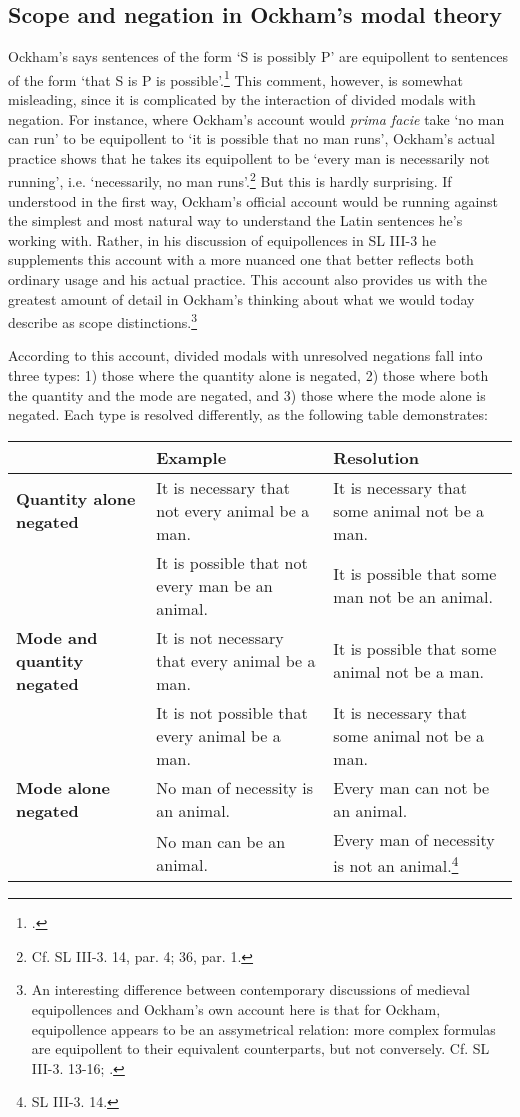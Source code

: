 \documentclass[a4paper]{article}
\begin{document}
\subsection{Scope and negation in Ockham's modal theory}
Ockham's says sentences of the form `S is possibly P' are equipollent to sentences of the form `that S is P is possible'.\footnote{\cite[II. 9, p. 246; 10, p. 248]{OckhamSL2}.} This comment, however, is somewhat misleading, since it is complicated by the interaction of divided modals with negation. For instance, where Ockham's account would \textit{prima facie} take `no man can run' to be equipollent to `it is possible that no man runs', Ockham's actual practice shows that he takes its equipollent to be `every man is necessarily not running', i.e. `necessarily, no man runs'.\footnote{Cf. SL III-3. 14, par. 4; 36, par. 1.}  But this is hardly surprising. If understood in the first way, Ockham's official account would be running against the simplest and most natural way to understand the Latin sentences he's working with. Rather, in his discussion of equipollences in SL III-3 he supplements this account with a more nuanced one that better reflects both ordinary usage and his actual practice. This account also provides us with the greatest amount of detail in Ockham's thinking about what we would today describe as scope distinctions.\footnote{An interesting difference between contemporary discussions of medieval equipollences and Ockham’s own account here is that for Ockham, equipollence appears to be an assymetrical relation: more complex formulas are equipollent to their equivalent counterparts, but not conversely. Cf. SL III-3. 13-16; \cite[pp. 60-62]{Parsons2014}.}

According to this account, divided modals with unresolved negations fall into three types: 1) those where the quantity alone is negated, 2) those where both the quantity and the mode are negated, and 3) those where the mode alone is negated. Each type is resolved differently, as the following table demonstrates:
\begin{center}
\begin{tabular}{|p{3cm}|p{4cm}|p{4cm}|}
\hline & \textbf{Example} & \textbf{Resolution}  \\
\hline \textbf{Quantity alone negated}  & It is necessary that not every animal be a man. & It is necessary that some animal not be a man. \\
& It is possible that not every man be an animal. & It is possible that some man not be an animal. \\ \hline 
\textbf{Mode and quantity negated} & It is not necessary that every animal be a man. & It is possible that some animal not be a man. \\
& It is not possible that every animal be a man. & It is necessary that some animal not be a man. \\ \hline 
\textbf{Mode alone negated} & No man of necessity is an animal. & Every man can not be an animal. \\
& No man can be an animal. & Every man of necessity is not an animal.\footnote{SL III-3. 14.} \\ \hline
\end{tabular}
\end{center}
\bigskip
\end{document}
